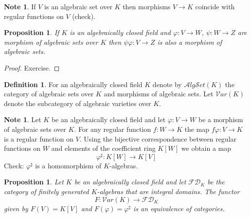 \documentclass[12pt, letterpaper, oneside]{article}
\theoremstyle{plain}
\newtheorem{proposition}[theorem]{Proposition}
\theoremstyle{definition}
\newtheorem{definition}[theorem]{Definition}
\newtheorem{note}[theorem]{Note}
\newcommand{\vs}{\vskip 5mm}
\begin{document}
\vs\vs

\begin{note}
If $V$ is an algebraic set over $K$ then morphisms $V \to K$ coincide with regular 
functions on $V$ (check).  
\end{note}

\vs\vs


\begin{proposition}
If $K$ is an algebraically closed field and  $\varphi\colon V\to W$, $\psi\colon W \to Z$
are  morphism of algebraic sets over $K$ then $\psi\varphi\colon V\to Z$ is also a morphism 
of algebraic sets.  
\end{proposition}

\vs

\begin{proof}
Exercise. 
\end{proof}


\vs\vs

\begin{definition}
For  an algebraically closed field $K$ denote by $\mathcal{A}lg\mathcal{S}et(K)$ the category 
of algebraic sets over $K$ and morphisms of algebraic sets. 
Let $\mathcal{V}ar(K)$ denote the subcategory of algebraic varieties over $K$. 
\end{definition}

\vs\vs

\begin{note}
Let $K$ be an algebraically closed field and let  $\varphi \colon V \to W$ be a morphism of 
algebraic sets over $K$. For any regular function $f\colon W\to K$ the map
$f\varphi\colon V \to K$ is a regular function on $V$. Using the bijective correspondence 
between regular functions on $W$  and elements of the coefficient ring $K[W]$ we obtain a map 
$$\varphi^{\sharp}\colon K[W] \to K[V]$$
Check: $\varphi^{\sharp}$ is a homomorphism of $K$-algebras. 
\end{note}

\vs\vs

\begin{proposition}
Let $K$ be an algebraically closed field and let $\mathcal{F}\mathcal{D}_{K}$ be the category 
of finitely generated  $K$-algebras that are integral domains. 
The functor
$$F \colon \mathcal{V}ar(K) \to \mathcal{F}\mathcal{D}_{K}$$
given by $F(V) = K[V]$ and $F(\varphi) = \varphi^{\sharp}$ is an equivalence of categories. 
\end{proposition}

\end{document}
